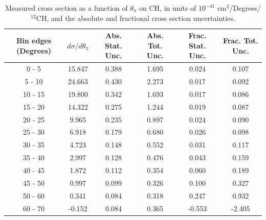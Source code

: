 \documentclass[aps,prl,twocolumn,superscriptaddress,nofootinbib]{revtex4-1}
\begin{document}
\begin{table}[h!]
  \centering
  \caption{Measured cross section as a function of $\theta_{\pi}$ on CH, in units of
  $10^{-41}$ $\text{cm}^{2}$/Degrees/$^{12}$CH, and the absolute and
  fractional cross section uncertainties.}
    \begin{tabular}{c||c||c|c||c|c}
      Bin edges (Degrees)  &  $d\sigma/d\theta_{\pi}$  &  Abs. Stat. Unc. & Abs. Tot. Unc.  &  Frac. Stat. Unc.  &  Frac. Tot. Unc. \\
      \hline\hline
        0 - 5 & 15.847 & 0.388 & 1.695 & 0.024 & 0.107 \\
       5 - 10 & 24.663 & 0.430 & 2.273 & 0.017 & 0.092 \\
      10 - 15 & 19.800 & 0.342 & 1.693 & 0.017 & 0.086 \\
      15 - 20 & 14.322 & 0.275 & 1.244 & 0.019 & 0.087 \\
      20 - 25 & 9.965 & 0.235 & 0.897 & 0.024 & 0.090 \\
      25 - 30 & 6.918 & 0.179 & 0.680 & 0.026 & 0.098 \\
      30 - 35 & 4.723 & 0.148 & 0.552 & 0.031 & 0.117 \\
      35 - 40 & 2.997 & 0.128 & 0.476 & 0.043 & 0.159 \\
      40 - 45 & 1.872 & 0.112 & 0.354 & 0.060 & 0.189 \\
      45 - 50 & 0.997 & 0.099 & 0.326 & 0.100 & 0.327 \\
      50 - 60 & 0.341 & 0.084 & 0.318 & 0.247 & 0.932 \\ 
      60 - 70 & -0.152 & 0.084 & 0.365 & -0.553 & -2.405 \\
    \end{tabular}
  \label{table:ThetaPiXSec_CH}
\end{table}
\end{document}
